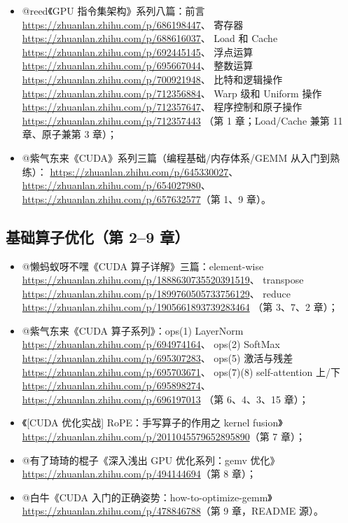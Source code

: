 \begin{itemize}
  \item @reed《GPU 指令集架构》系列八篇：前言 \url{https://zhuanlan.zhihu.com/p/686198447}、
        寄存器 \url{https://zhuanlan.zhihu.com/p/688616037}、
        Load 和 Cache \url{https://zhuanlan.zhihu.com/p/692445145}、
        浮点运算 \url{https://zhuanlan.zhihu.com/p/695667044}、
        整数运算 \url{https://zhuanlan.zhihu.com/p/700921948}、
        比特和逻辑操作 \url{https://zhuanlan.zhihu.com/p/712356884}、
        Warp 级和 Uniform 操作 \url{https://zhuanlan.zhihu.com/p/712357647}、
        程序控制和原子操作 \url{https://zhuanlan.zhihu.com/p/712357443}
        （第 1 章；Load/Cache 兼第 11 章、原子兼第 3 章）；
  \item @紫气东来《CUDA》系列三篇（编程基础/内存体系/GEMM 从入门到熟练）：
        \url{https://zhuanlan.zhihu.com/p/645330027}、
        \url{https://zhuanlan.zhihu.com/p/654027980}、
        \url{https://zhuanlan.zhihu.com/p/657632577}（第 1、9 章）。
\end{itemize}

\subsection{基础算子优化（第 2--9 章）}

\begin{itemize}
  \item @懒蚂蚁呀不嘿《CUDA 算子详解》三篇：element-wise
        \url{https://zhuanlan.zhihu.com/p/1888630735520391519}、
        transpose \url{https://zhuanlan.zhihu.com/p/1899760505733756129}、
        reduce \url{https://zhuanlan.zhihu.com/p/1905661893739283464}
        （第 3、7、2 章）；
  \item @紫气东来《CUDA 算子系列》：ops(1) LayerNorm
        \url{https://zhuanlan.zhihu.com/p/694974164}、
        ops(2) SoftMax \url{https://zhuanlan.zhihu.com/p/695307283}、
        ops(5) 激活与残差 \url{https://zhuanlan.zhihu.com/p/695703671}、
        ops(7)(8) self-attention 上/下
        \url{https://zhuanlan.zhihu.com/p/695898274}、
        \url{https://zhuanlan.zhihu.com/p/696197013}
        （第 6、4、3、15 章）；
  \item 《[CUDA 优化实战] RoPE：手写算子的作用之 kernel fusion》
        \url{https://zhuanlan.zhihu.com/p/2011045579652895890}（第 7 章）；
  \item @有了琦琦的棍子《深入浅出 GPU 优化系列：gemv 优化》
        \url{https://zhuanlan.zhihu.com/p/494144694}（第 8 章）；
  \item @白牛《CUDA 入门的正确姿势：how-to-optimize-gemm》
        \url{https://zhuanlan.zhihu.com/p/478846788}（第 9 章，README 源）。
\end{itemize}

